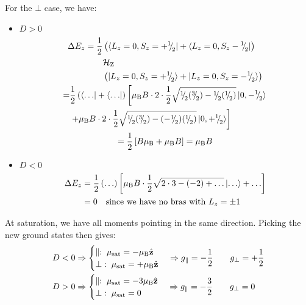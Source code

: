 \begin{parts}
	For the $\bot$ case, we have:
	\begin{itemize}
		\item \underline{$D > 0$}
		\begin{gather*}
			\begin{split}
				\Delta E_z = \frac{1}{2} &\rbracket{\bra{L_z = 0, S_z = +\diagfrac{1}{2}} + \bra{L_z = 0, S_z -\diagfrac{1}{2}}} \\
				&\mathcal{H}_\textnormal{Z} \\
				&\rbracket{\ket{L_z = 0, S_z = +\diagfrac{1}{2}} + \ket{L_z = 0, S_z = -\diagfrac{1}{2}}}
			\end{split} \\
			\begin{split}
				= &\frac{1}{2} \rbracket{\bra{\ldots} + \bra{\ldots}}
				\sbracket{\bohrmagneton  B \cdot 2 \cdot \frac{1}{2} \sqrt{\diagfrac{1}{2} (\diagfrac{3}{2}) - \diagfrac{1}{2} (\diagfrac{1}{2})} \ket{0, -\diagfrac{1}{2}} \right. \\
				&\left. + \bohrmagneton  B \cdot 2 \cdot \frac{1}{2} \sqrt{\diagfrac{1}{2} (\diagfrac{3}{2}) - (-\diagfrac{1}{2}) (\diagfrac{1}{2})} \ket{0, +\diagfrac{1}{2}}}
			\end{split} \\
			= \frac{1}{2} \sbracket{B \bohrmagneton  + \bohrmagneton  B} = \bohrmagneton  B
		\end{gather*}
		\item \underline{$D < 0$}
		\begin{align*}
			\Delta E_z &= \frac{1}{2} \left(\ldots\right) \left[\mu_\mathrm{B}  B \cdot \frac{1}{2} \sqrt{2 \cdot 3 - (-2) + \ldots} \ket{\ldots} + \ldots\right] \\
			&= 0 \textnormal{\hspace{1em}since we have no bras with $L_z = \pm 1$}
		\end{align*}
	\end{itemize}
	
	At saturation, we have all moments pointing in the same direction.
	Picking the new ground states then gives:
	\begin{align*}
		D < 0 &\Rightarrow \begin{cases}
			\parallel:\; \mathbf{\mu}_\textnormal{sat} = -\mu_\mathrm{B}  \hat{\mathbf{z}} \\
			\bot:\; \mathbf{\mu}_\textnormal{sat} = +\mu_\mathrm{B}  \hat{\mathbf{z}}
		\end{cases} \Rightarrow g_\parallel = -\frac{1}{2} \qquad g_\bot = +\frac{1}{2} \\
		D > 0 &\Rightarrow \begin{cases}
			\parallel:\; \mathbf{\mu}_\textnormal{sat} = -3\mu_\mathrm{B}  \hat{\mathbf{z}} \\
			\bot:\; \mathbf{\mu}_\textnormal{sat} = 0
		\end{cases} \Rightarrow g_\parallel = -\frac{3}{2} \qquad g_\bot = 0
	\end{align*}
	

\end{parts}
